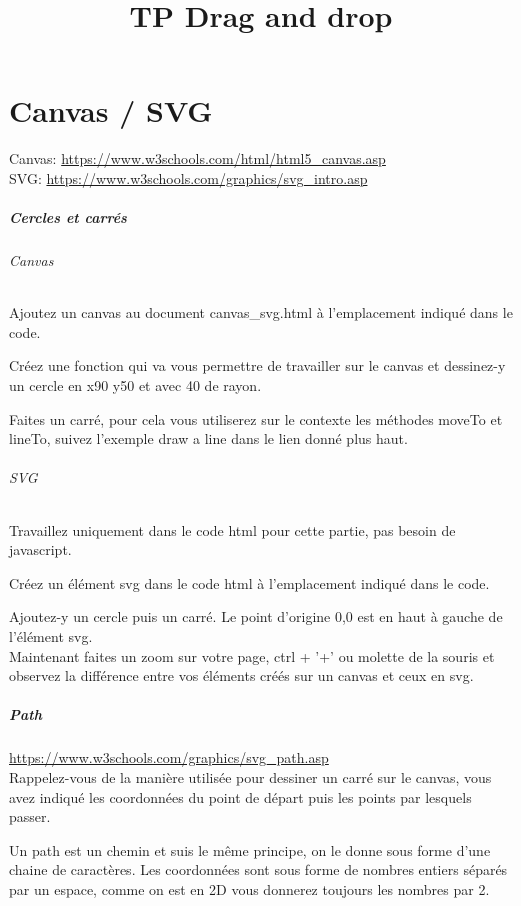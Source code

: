\documentclass[a4paper,10pt]{report}
\title{TP Drag and drop}
\author{}
\begin{document}
\maketitle

\chapter{Canvas / SVG}{}
Canvas: 
\url{https://www.w3schools.com/html/html5_canvas.asp}\\
SVG:
\url{https://www.w3schools.com/graphics/svg_intro.asp}

\paragraph{Cercles et carrés}
\subparagraph{Canvas}
Ajoutez un canvas au document canvas\_svg.html à l'emplacement indiqué dans le code.

Créez une fonction qui va vous permettre de travailler sur le canvas et dessinez-y un cercle en x90 y50 et avec 40 de rayon.

Faites un carré, pour cela vous utiliserez sur le contexte les méthodes moveTo et lineTo, suivez l'exemple draw a line dans le lien donné plus haut.

\subparagraph{SVG}
Travaillez uniquement dans le code html pour cette partie, pas besoin de javascript.

Créez un élément svg dans le code html à l'emplacement indiqué dans le code.

Ajoutez-y un cercle puis un carré. Le point d'origine 0,0 est en haut à gauche de l'élément svg.\\


Maintenant faites un zoom sur votre page, ctrl + '+' ou molette de la souris et observez la différence entre vos éléments créés sur un canvas et ceux en svg.

\paragraph{Path}

\url{https://www.w3schools.com/graphics/svg_path.asp}\\
Rappelez-vous de la manière utilisée pour dessiner un carré sur le canvas, vous avez indiqué les coordonnées du point de départ puis les points par lesquels passer.

Un path est un chemin et suis le même principe, on le donne sous forme d'une chaine de caractères.
Les coordonnées sont sous forme de nombres entiers séparés par un espace, comme on est en 2D vous donnerez toujours les nombres par 2.
\end{document}
